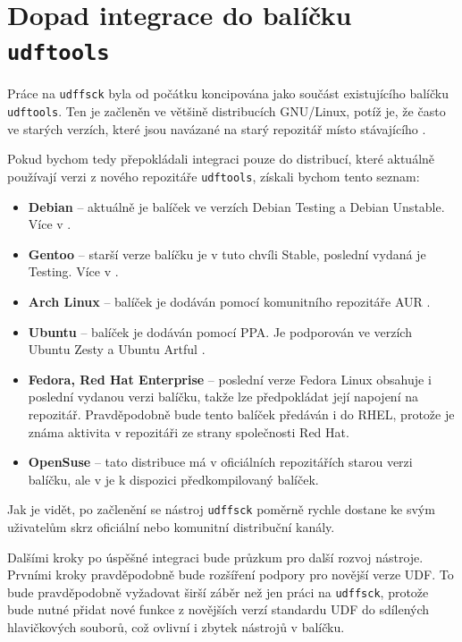\section{Dopad integrace do balíčku \texttt{udftools}}
\label{sec:dopad}
Práce na \texttt{udffsck} byla od počátku koncipována jako součást existujícího balíčku \texttt{udftools}. Ten je začleněn ve většině distribucích GNU/Linux, potíž je, že často ve starých verzích, které jsou navázané na starý repozitář \cite{udftools-sourceforge} místo stávajícího \cite{udftools-github}.

Pokud bychom tedy přepokládali integraci pouze do distribucí, které aktuálně používají verzi z nového repozitáře \texttt{udftools}, získali bychom tento seznam:
\begin{itemize}
    \item\textbf{Debian} -- aktuálně je balíček ve verzích Debian Testing a Debian Unstable. Více v \cite{udftools-debian}.
    \item\textbf{Gentoo} -- starší verze balíčku je v tuto chvíli Stable, poslední vydaná je Testing. Více v \cite{udftools-gentoo}.
    \item\textbf{Arch Linux} -- balíček je dodáván pomocí komunitního repozitáře AUR \cite{udftools-arch}.
    \item\textbf{Ubuntu} -- balíček je dodáván pomocí PPA. Je podporován ve verzích Ubuntu Zesty a Ubuntu Artful \cite{udftools-ppa}.
    \item\textbf{Fedora, Red Hat Enterprise} -- poslední verze Fedora Linux obsahuje i poslední vydanou verzi balíčku, takže lze předpokládat její napojení na repozitář. Pravděpodobně bude tento balíček předáván i do RHEL, protože je známa aktivita v repozitáři ze strany společnosti Red Hat.
    \item\textbf{OpenSuse} -- tato distribuce má v oficiálních repozitářích starou verzi balíčku, ale v \cite{udftools-rpm} je k dispozici předkompilovaný balíček.
\end{itemize}
Jak je vidět, po začlenění se nástroj \texttt{udffsck} poměrně rychle dostane ke svým uživatelům skrz oficiální nebo komunitní distribuční kanály.

Dalšími kroky po úspěšné integraci bude průzkum pro další rozvoj nástroje. Prvními kroky pravděpodobně bude rozšíření podpory pro novější verze UDF. To bude pravděpodobně vyžadovat širší záběr než jen práci na \texttt{udffsck}, protože bude nutné přidat nové funkce z novějších verzí standardu UDF do sdílených hlavičkových souborů, což ovlivní i zbytek nástrojů v balíčku.
